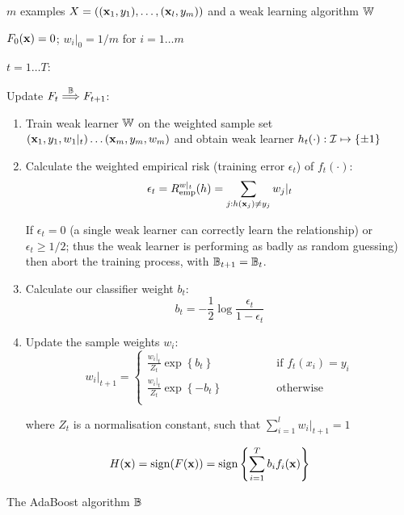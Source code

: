 \begin{linefigure}
\label{fig:boosting algorithm}
 $m$ examples $X = ((\mathbf{x}_1, y_1), \ldots, (\mathbf{x}_l,
y_m))$ and a weak learning algorithm $\mathbb{W}$
\par
{} $F_0(\mathbf{x}) = 0$; $w_i|_0 = 1/m$ for
$i=1 \ldots m$ 
\par
{} $t=1 \ldots T$:
\par
\noindent Update $F_t \stackrel{\mathbb{B}}{\Longrightarrow} F_{t+1}$: 
\par
\begin{enumerate}

\item	Train weak learner $\mathbb{W}$ on the weighted sample set 
	$(\mathbf{x}_1, y_1, w_1|_t) \ldots (\mathbf{x}_m, y_m, w_m)$
	and obtain weak learner $h_t(\cdot) : \mathcal{I} \mapsto \{\pm 1\}$

\item	Calculate the weighted empirical risk (training error
	$\epsilon_t$) of $f_t(\cdot)$: 
	\begin{equation}
	\epsilon_t = R_{\mathrm{emp}}^{w|_t}(h) = \sum_{j : h(\mathbf{x}_j) \neq
	y_j} w_j|_t
	\end{equation}

	If $\epsilon_t = 0$ (a single weak learner can correctly learn
	the relationship) or $\epsilon_t \geq 1/2$; thus the weak
	learner is performing as badly as random guessing) then abort
	the training process, with $\mathbb{B}_{t+1} = \mathbb{B}_{t}$.

\item	Calculate our classifier weight $b_t$:
	\begin{equation}
	b_t = - \frac{1}{2} \log \frac{\epsilon_t}{1 - \epsilon_t}
	\end{equation}

\item	Update the sample weights $w_i$:
	\begin{equation}
	w_i|_{t+1} = \left\{
	\begin{array}{cl}
		\frac{w_i|_t}{Z_t} \exp \left\{ b_t \right\}&	\qquad \qquad \mbox{if 
		$f_t(x_i) = y_i$} \\
		\frac{w_i|_t}{Z_t} \exp \left\{ -b_t \right\} & \qquad \qquad
		\mbox{otherwise} \\
	\end{array} \right.
	\label{eqn:sample weight update}
	\end{equation}

	where $Z_t$ is a normalisation constant, such that
	$\sum_{i=1}^{l} w_i|_{t+1} = 1$
\end{enumerate}

\par
{} 
\begin{equation}
H(\mathbf{x}) = \mathrm{sign} (F(\mathbf{x})) = \mathrm{sign} \left\{ \sum_{i=1}^T b_i f_i(\mathbf{x}) \right\}
\end{equation}
\caption{The AdaBoost algorithm $\mathbb{B}$}
\end{linefigure}



